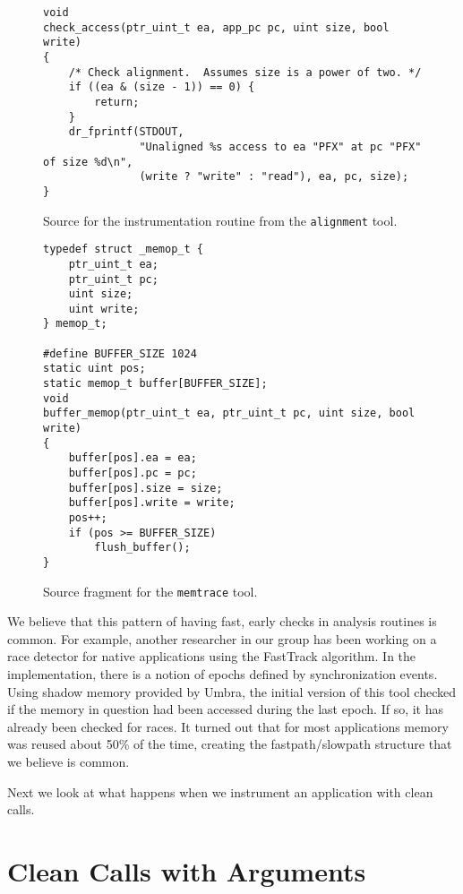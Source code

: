 \begin{figure}
\begin{verbatim}
void
check_access(ptr_uint_t ea, app_pc pc, uint size, bool write)
{
    /* Check alignment.  Assumes size is a power of two. */
    if ((ea & (size - 1)) == 0) {
        return;
    }
    dr_fprintf(STDOUT,
               "Unaligned %s access to ea "PFX" at pc "PFX" of size %d\n",
               (write ? "write" : "read"), ea, pc, size);
}
\end{verbatim}
\caption{Source for the instrumentation routine from the {\tt alignment} tool.}
\label{fig:alignment_src}
\end{figure}

\begin{figure}
\begin{verbatim}
typedef struct _memop_t {
    ptr_uint_t ea;
    ptr_uint_t pc;
    uint size;
    uint write;
} memop_t;

#define BUFFER_SIZE 1024
static uint pos;
static memop_t buffer[BUFFER_SIZE];
void
buffer_memop(ptr_uint_t ea, ptr_uint_t pc, uint size, bool write)
{
    buffer[pos].ea = ea;
    buffer[pos].pc = pc;
    buffer[pos].size = size;
    buffer[pos].write = write;
    pos++;
    if (pos >= BUFFER_SIZE)
        flush_buffer();
}
\end{verbatim}
\caption{Source fragment for the {\tt memtrace} tool.}
\label{fig:memtrace_src}
\end{figure}

We believe that this pattern of having fast, early checks in analysis routines
is common.  For example, another researcher in our group has been working on a
race detector for native applications using the FastTrack
algorithm\cite{fasttrack}.  In the implementation, there is a notion of epochs
defined by synchronization events.  Using shadow memory provided by
Umbra\cite{umbra}, the initial version of this tool checked if the memory in
question had been accessed during the last epoch.  If so, it has already been
checked for races.  It turned out that for most applications memory was reused
about 50\% of the time, creating the fastpath/slowpath structure that we believe
is common.

Next we look at what happens when we instrument an application with clean calls.

\section{Clean Calls with Arguments}

